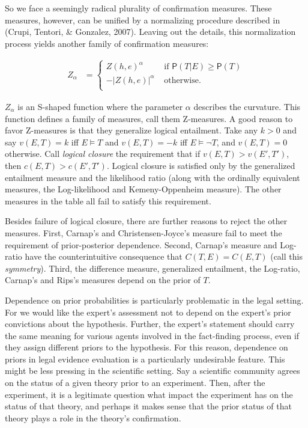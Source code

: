 \documentclass[
  10pt,
  dvipsnames,enabledeprecatedfontcommands]{scrartcl}
\newcommand{\n}{\neg}
\newcommand{\pr}[1]{\mathsf{P}(#1)}
\begin{document}
So we face a seemingly radical plurality of confirmation measures. These
measures, however, can be unified by a normalizing procedure described
in (Crupi, Tentori, \& Gonzalez, 2007). Leaving out the details, this
normalization process yields another family of confirmation measures:

\begin{align*}
Z_{\alpha}  & =  \left\{ \begin{array}{lr} 
Z(h, e)^{\alpha} & \mbox{ if } \pr{T\vert E} \geq \pr{T}\\
- |Z(h, e)|^{\alpha} &\mbox { otherwise.}\\
\end{array} \right.
\end{align*}

\noindent \(Z_{\alpha}\) is an S-shaped function where the parameter
\(\alpha\) describes the curvature. This function defines a family of
measures, call them Z-measures. A good reason to favor Z-measures is
that they generalize logical entailment. Take any \(k > 0\) and say
\(v(E,T) =k\) iff \(E\models T\) and \(v(E,T) = -k\) iff
\(E \models \n T\), and \(v(E,T)=0\) otherwise. Call
\emph{logical closure} the requirement that if \(v(E,T) > v(E', T')\),
then \(c(E, T) > c(E' , T' )\). Logical closure is satisfied only by the
generalized entailment measure and the likelihood ratio (along with the
ordinally equivalent measures, the Log-likelihood and Kemeny-Oppenheim
measure). The other measures in the table all fail to satisfy this
requirement.

Besides failure of logical closure, there are further reasons to reject
the other measures. First, Carnap's and Christensen-Joyce's measure fail
to meet the requirement of prior-posterior dependence. Second, Carnap's
measure and Log-ratio have the counterintuitive consequence that
\(C(T,E)= C(E,T)\) (call this \emph{symmetry}). Third, the difference
measure, generalized entailment, the Log-ratio, Carnap's and Rips's
measures depend on the prior of \(T\).

Dependence on prior probabilities is particularly problematic in the
legal setting. For we would like the expert's assessment not to depend
on the expert's prior convictions about the hypothesis. Further, the
expert's statement should carry the same meaning for various agents
involved in the fact-finding process, even if they assign different
priors to the hypothesis. For this reason, dependence on priors in legal
evidence evaluation is a particularly undesirable feature. This might be
less pressing in the scientific setting. Say a scientific community
agrees on the status of a given theory prior to an experiment. Then,
after the experiment, it is a legitimate question what impact the
experiment has on the status of that theory, and perhaps it makes sense
that the prior status of that theory plays a role in the theory's
confirmation.
\end{document}
